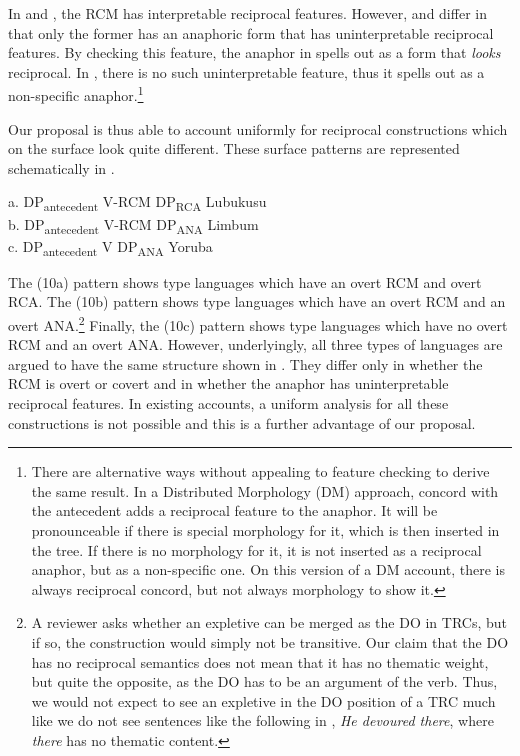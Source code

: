 \documentclass[output=paper]{langsci/langscibook}
\begin{document}
In  and , the RCM has interpretable reciprocal features. However,  and  differ in that only the former has an anaphoric form that has uninterpretable reciprocal features. By checking this feature, the anaphor in  spells out as a form that \textit{looks} reciprocal. In , there is no such uninterpretable feature, thus it spells out as a non-specific anaphor.\footnote{There are alternative ways without appealing to feature checking to derive the same result. In a Distributed Morphology (DM) approach, concord with the antecedent adds a reciprocal feature to the anaphor. It will be pronounceable if there is special morphology for it, which is then inserted in the tree. If there is no morphology for it, it is not inserted as a reciprocal anaphor, but as a non-specific one. On this version of a DM account, there is always reciprocal concord, but not always morphology to show it.} 

Our proposal is thus able to account uniformly for reciprocal constructions which on the surface look quite different. These surface patterns are represented schematically in .


\ea\label{ex:safir:10}
\glll a. DP\-\textsubscript{antecedent}      V-RCM  DP\textsubscript{RCA}  {} {} {} {} {Lubukusu} \\
b. DP\-\textsubscript{antecedent}      V-RCM  DP\textsubscript{ANA}  {} {} {} {} {Limbum} \\
c. DP\-\textsubscript{antecedent}      V    DP\textsubscript{ANA}  {} {} {} { } {Yoruba}   \\
\z

The (10a) pattern shows  type languages which have an overt RCM and overt RCA. The (10b) pattern shows  type languages which have an overt RCM and an overt ANA.\footnote{A reviewer asks whether an expletive can be merged as the DO in TRCs, but if so, the construction would simply not be transitive. Our claim that the DO has no reciprocal semantics does not mean that it has no thematic weight, but quite the opposite, as the DO has to be an argument of the verb. Thus, we would not expect to see an expletive in the DO position of a TRC much like we do not see sentences like the following in , \textit{He devoured there}, where \textit{there} has no thematic content.}   Finally, the (10c) pattern shows  type languages which have no overt RCM and an overt ANA. However, underlyingly, all three types of languages are argued to have the same structure shown in . They differ only in whether the RCM is overt or covert and in whether the anaphor has uninterpretable reciprocal features.  In existing accounts, a uniform analysis for all these constructions is not possible and this is a further advantage of our proposal. 
\end{document}
